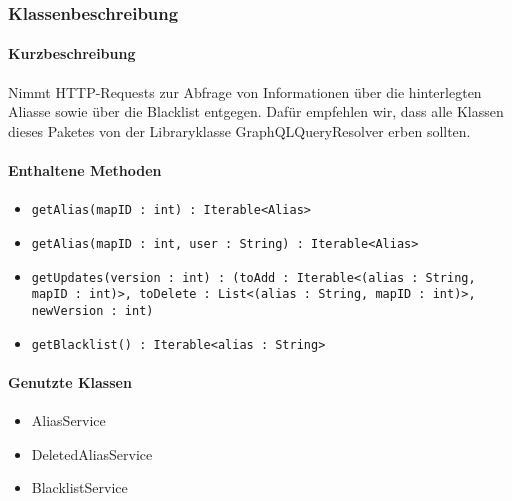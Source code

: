 \subsubsection*{Klassenbeschreibung}%
\paragraph*{Kurzbeschreibung}
Nimmt HTTP-Requests zur Abfrage von Informationen über die hinterlegten Aliasse sowie über die Blacklist entgegen.
Dafür empfehlen wir, dass alle Klassen dieses Paketes von der Libraryklasse \dq GraphQLQueryResolver \dq erben sollten.
\paragraph*{Enthaltene Methoden}
\begin{itemize}
    \item \texttt{getAlias(mapID : int) : Iterable<Alias>}
    \item \texttt{getAlias(mapID : int, user : String) : Iterable<Alias>}
    \item \texttt{getUpdates(version : int) : (toAdd : Iterable<(alias : String, mapID : int)>, toDelete : List<(alias : String, mapID : int)>, newVersion : int)}
    \item \texttt{getBlacklist() : Iterable<alias : String>}
\end{itemize}
\paragraph*{Genutzte Klassen}
\begin{itemize}
    \item AliasService
    \item DeletedAliasService
    \item BlacklistService
\end{itemize}